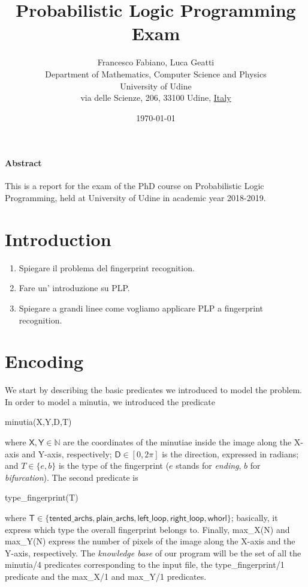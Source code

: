 \documentclass[8pt]{article}
\title{Probabilistic Logic Programming Exam}
\author{
        Francesco Fabiano, Luca Geatti\\
        \footnotesize Department of Mathematics, Computer Science and Physics \\
        \footnotesize University of Udine\\
        \footnotesize via delle Scienze, 206, 33100 Udine, \underline{Italy}
}
\date{\footnotesize\today}
\begin{document}
\maketitle
\paragraph{Abstract}
This is a report for the exam of the PhD course on Probabilistic Logic
Programming, held at University of Udine in academic year 2018-2019.



\section{Introduction}
\begin{enumerate}
  \item
    Spiegare il problema del fingerprint recognition.
  \item
    Fare un' introduzione su PLP.
  \item
    Spiegare a grandi linee come vogliamo applicare PLP a 
    fingerprint recognition.
\end{enumerate}




\section{Encoding}
\label{sec:encoding}
We start by describing the basic predicates we introduced to model
the problem. In order to model a minutia, we introduced the predicate
  \begin{center}
    \textsf{minutia(X,Y,D,T)}
  \end{center}
where $\textsf{X},\textsf{Y} \in \mathbb{N}$ are the coordinates of the minutiae 
inside the image along the X-axis and Y-axis, respectively;
$\textsf{D} \in [0,2\pi]$ is the direction, expressed in radians; 
and $T \in \{e,b\}$ is the type of the fingerprint ($e$ stands for
\emph{ending}, $b$ for \emph{bifurcation}).
The second predicate is
  \begin{center}
    \textsf{type\_fingerprint(T)}
  \end{center}
where $\textsf{T}\in\{
  \textsf{tented\_archs},
  \textsf{plain\_archs},
  \textsf{left\_loop},
  \textsf{right\_loop},
  \textsf{whorl}
\}$; 
basically, it express which type the overall fingerprint belongs to.
Finally, \textsf{max\_X(N)} and \textsf{max\_Y(N)} express the number
of pixels of the image along the X-axis and the Y-axis, respectively.
The \emph{knowledge base} of our program will be the set of all the 
\textsf{minutia/4} predicates corresponding to the input file,
the \textsf{type\_fingerprint/1} predicate and the \textsf{max\_X/1}
and \textsf{max\_Y/1} predicates.
\end{document}
